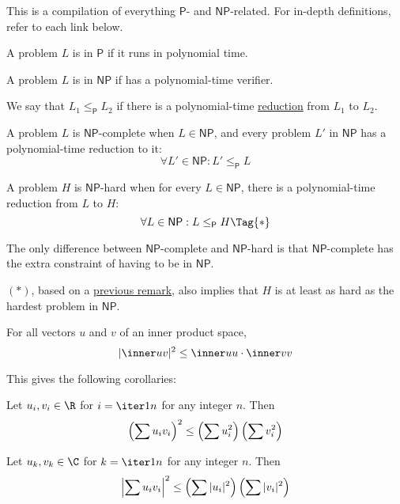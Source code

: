 \label{e04bcbc}

This is a compilation of everything $\mathsf P$- and $\mathsf{NP}$-related. For
in-depth definitions, refer to each link below.

A problem $L$ is in $\mathsf P$ if it runs in polynomial time.

A problem $L$ is in $\mathsf{NP}$ if has a polynomial-time verifier.

We say that $L_1\leq_{\mathsf P}L_2$ if there is a polynomial-time
\href{e009acb}{reduction} from $L_1$ to $L_2$.

A problem $L$ is $\mathsf{NP}$-complete when $L\in\mathsf{NP}$, and every
problem $L'$ in $\mathsf{NP}$ has a polynomial-time reduction to it:
$$
  \forall L'\in\mathsf{NP}: L'\leq_{\mathsf P}L
$$

A problem $H$ is $\mathsf{NP}$-hard when for every $L\in\mathsf{NP}$, there is
a polynomial-time reduction from $L$ to $H$:
\begin{equation*}
  \forall L\in\mathsf{NP}: L\leq_{\mathsf P}H\Tag{*}
\end{equation*}

The only difference between $\mathsf{NP}$-complete and $\mathsf{NP}$-hard is
that $\mathsf{NP}$-complete has the extra constraint of having to be in
$\mathsf{NP}$.

$(*)$, based on a \href{e04bcbc}{previous remark}, also implies that
$H$ is at least as hard as the hardest problem in $\mathsf{NP}$.

\label{c503127}

For all vectors $u$ and $v$ of an inner product space,
$$
  |\inner uv|^2\leq\inner uu\cdot\inner vv
$$

This gives the following corollaries:
\begin{enumerata}

  \item Let $u_i,v_i\in\R$ for $i=\iter1n$ for any integer $n$. Then
  \begin{equation*}
    \def\su{\sum}\def\u{u_i}\def\v{v_i}
    \left(\su\u\v\right)^2\leq\left(\su\u^2\right)\left(\su\v^2\right)
  \end{equation*}

  \item Let $u_k,v_k\in\C$ for $k=\iter1n$ for any integer $n$. Then
  \begin{equation*}
    \def\su{\sum}\def\u{u_i}\def\v{v_i}
    \left|\su\u\v\right|^2\leq\left(\su|\u|^2\right)\left(\su|\v|^2\right)
  \end{equation*}
\end{enumerata}


